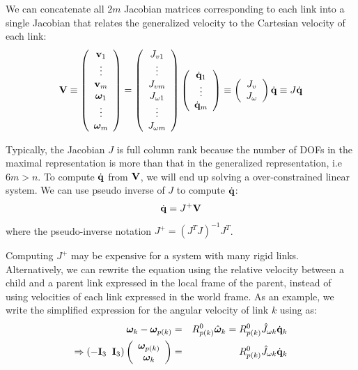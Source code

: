 We can concatenate all $2m$ Jacobian matrices corresponding to each link into a single Jacobian
that relates the generalized velocity to the Cartesian velocity of each
link:
\begin{equation}
\mathbf{V} \equiv 
\left(
\begin{array}{c}
\mathbf{v}_1 \\
\vdots \\
\mathbf{v}_m \\
\bm{\omega}_1 \\
\vdots \\
\bm{\omega}_m
\end{array}
\right) = 
\left (
\begin{array}{c}
J_{v1} \\
\vdots \\
J_{vm} \\
J_{\omega 1} \\
\vdots \\
J_{\omega m}
\end{array}
\right) 
\left(
\begin{array}{c}
\dot{\mathbf{q}}_1\\
\vdots \\
\dot{\mathbf{q}}_m
\end{array}
\right)  \equiv \left(
\begin{array}{c}
J_v\\
J_{\omega}
\end{array}
\right)\dot{\mathbf{q}} \equiv J \dot{\mathbf{q}}
\end{equation}

Typically, the Jacobian $J$ is full column rank because the
number of DOFs in the maximal representation is more than that in the
generalized representation, i.e $6m > n$. To compute $\dot{\mathbf{q}}$ from $\mathbf{V}$, we
will end up solving a over-constrained linear system. We can use
pseudo inverse of $J$ to compute $\dot{\mathbf{q}}$:
\begin{equation}
 \dot{\mathbf{q}} =  J^+\mathbf{V}
 \end{equation}
where the pseudo-inverse notation $J^+ = (J^TJ)^{-1}J^T$. 

Computing $J^+$ may be expensive for a system with many rigid links. 
Alternatively, we can rewrite the equation using the relative velocity between a child and a parent link expressed in the local
frame of the parent, instead of using velocities of each link
expressed in the world frame. As an example, we write the simplified expression for the angular velocity of link $k$ using  as: 
\begin{eqnarray}
\nonumber
\bm{\omega}_k - \bm{\omega}_{p(k)} & = & R^0_{p(k)}\hat{\bm{\omega}}_k = R^0_{p(k)}\hat{J}_{\omega k} \dot{\mathbf{q}}_k \\
\Rightarrow \left ( -\mathbf{I}_3\;\; \mathbf{I}_3 \right ) 
\left ( 
\begin{array}{c}
\bm{\omega}_{p(k)}\\
\bm{\omega}_k
\end{array}
\right ) & = & R^0_{p(k)}\hat{J}_{\omega k} \dot{\mathbf{q}}_k
\end{eqnarray}

